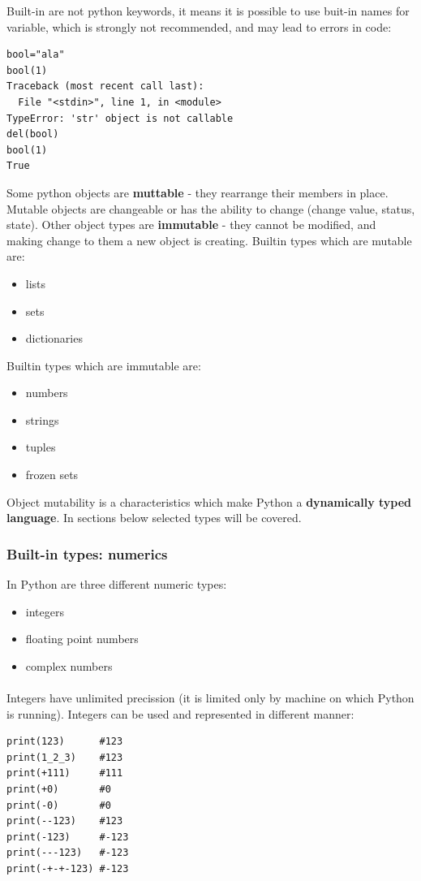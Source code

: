 \documentclass{article}
\begin{document}
	Built-in are not python keywords, it means it is possible to use buit-in names for variable, which is strongly not recommended, and may lead to errors in code:
	\begin{lstlisting}[style=pystyle]
bool="ala"
bool(1)
Traceback (most recent call last):
  File "<stdin>", line 1, in <module>
TypeError: 'str' object is not callable
del(bool)
bool(1)
True
	\end{lstlisting}
Some python objects are \textbf{muttable} - they rearrange their members in place. Mutable objects are changeable or has the ability to change (change value, status, state). Other object types are \textbf{immutable} - they cannot be modified, and making change to them a new object is creating. Builtin types which are mutable are:
\begin{itemize}
\item lists
\item sets
\item dictionaries
\end{itemize}
Builtin types which are immutable are:
\begin{itemize}
\item numbers
\item strings
\item tuples
\item frozen sets
\end{itemize}
Object mutability is a characteristics which make Python a \textbf{dynamically typed language}. 
	In sections below selected types will be covered.
	

	\subsubsection{Built-in types: numerics}
	In Python are three different numeric types:
	\begin{itemize}
	\item integers
	\item floating point numbers
	\item complex numbers
	\end{itemize}
	\paragraph{}
	Integers have unlimited precission (it is limited only by machine on which Python is running). Integers can be used and represented in different manner:
	\begin{lstlisting}[style=pystyle]
print(123)		#123
print(1_2_3)	#123
print(+111)		#111
print(+0)		#0
print(-0)		#0
print(--123)	#123
print(-123)		#-123 
print(---123)	#-123 
print(-+-+-123)	#-123
	\end{lstlisting}
\end{document}
